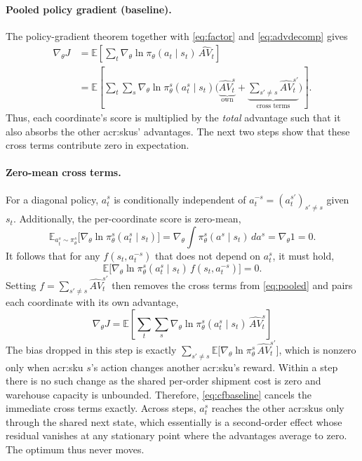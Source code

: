 \paragraph{\textbf{Pooled policy gradient (baseline).}} The policy-gradient theorem \citep{Sutton1999} together with
\eqref{eq:factor} and \eqref{eq:advdecomp} gives
\begin{align}
\nabla_\theta J
&=\mathbb{E}\!\left[\sum_t \nabla_\theta\ln\pi_\theta(a_t\mid s_t)\,\widehat{AV}_t\right]\\
&=\mathbb{E}\!\left[\sum_t\sum_{s}
\nabla_\theta\ln\pi_\theta^{s}(a_t^{s}\mid s_t)
\Big(\underbrace{\widehat{AV}_t^{s}}_{\text{own}}
+\underbrace{\textstyle\sum_{s'\ne s}\widehat{AV}_t^{s'}}_{\text{cross terms}}\Big)\right].
\label{eq:pooled}
\end{align}
Thus, each coordinate's score is multiplied by the \emph{total} advantage such that it also absorbs the other \glspl{acr:sku}' advantages. The next two steps show that these cross terms contribute zero in expectation.

\paragraph{\textbf{Zero-mean cross terms.}} For a diagonal policy, $a_t^{s}$ is conditionally
independent of $a_t^{-s}=(a_t^{s'})_{s'\ne s}$ given $s_t$. Additionally, the per-coordinate score is zero-mean,
\begin{equation}
\mathbb{E}_{a_t^{s}\sim\pi_\theta^{s}}\!\big[\nabla_\theta\ln\pi_\theta^{s}(a_t^{s}\mid s_t)\big]
=\nabla_\theta\!\int \pi_\theta^{s}(a^{s}\mid s_t)\,da^{s}=\nabla_\theta 1=0 .
\label{eq:scorezero}
\end{equation}
It follows that for any $f(s_t,a_t^{-s})$ that does not depend on $a_t^{s}$, it must hold, 
\begin{equation}
\mathbb{E}\!\big[\nabla_\theta\ln\pi_\theta^{s}(a_t^{s}\mid s_t)\,f(s_t,a_t^{-s})\big]=0 .
\label{eq:cfbaseline}
\end{equation}
Setting $f=\sum_{s'\ne s}\widehat{AV}_t^{s'}$ then removes the cross terms from \eqref{eq:pooled} and pairs
each coordinate with its own advantage,
\begin{equation}
\boxed{\;\nabla_\theta J
=\mathbb{E}\!\left[\sum_t\sum_{s}
\nabla_\theta\ln\pi_\theta^{s}(a_t^{s}\mid s_t)\,\widehat{AV}_t^{s}\right]\;}
\label{eq:decomp}
\end{equation}
The bias dropped in this step is exactly
$\sum_{s'\ne s}\mathbb{E}\big[\nabla_\theta\ln\pi_\theta^{s}\,\widehat{AV}_t^{s'}\big]$, which is
nonzero only when \gls{acr:sku} $s$'s action changes another \gls{acr:sku}'s reward. Within a step
there is no such change as the shared per-order shipment cost is zero and warehouse capacity
is unbounded. Therefore, \eqref{eq:cfbaseline} cancels the immediate cross terms exactly. Across steps,
$a_t^{s}$ reaches the other \glspl{acr:sku} only through the shared next state, which essentially is a second-order effect whose residual vanishes at any stationary point where the advantages average to zero. The optimum thus never moves.

